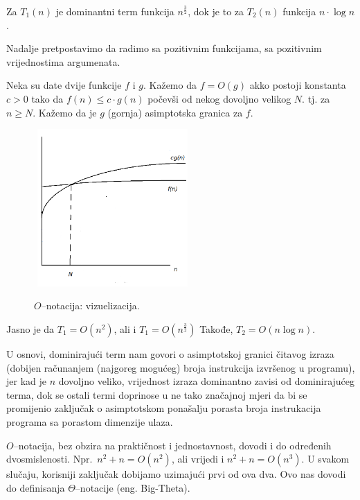 Za $T_1(n)$  je dominantni term funkcija $n^{\frac{3}{2}}$, dok je to za $T_2(n)$ funkcija $n \cdot \log n$. 
 
 Nadalje pretpostavimo da radimo sa pozitivnim funkcijama, sa pozitivnim vrijednostima argumenata. 


\begin{definition}
Neka su date dvije funkcije $f$ i $g$. Kažemo da $f = O(g)$ akko postoji konstanta $c >0$ tako da $f(n) \leq c \cdot g(n)$ počevši od nekog dovoljno velikog $N$. tj. za $n \geq {N}$. Kažemo da je $g$ (gornja) asimptotska granica za $f$. 
\end{definition}

\begin{figure}[H]
	\centering
	\includegraphics[width=170pt,height=170pt]{slike/O_notation.png}
	\label{fig:O_notation}
	\caption{$O$--notacija: vizuelizacija.}
\end{figure}



\begin{example}
	Jasno je da $T_1 = O(n^2)$, ali i $T_1 = O(n^{\frac{3}{2}})$ Takođe, $T_2 = O(n \log n)$. 
\end{example}

U osnovi, dominirajući term nam govori o asimptotskoj granici čitavog izraza (dobijen računanjem (najgoreg mogućeg) broja instrukcija izvršenog u programu), jer kad je $n$ dovoljno veliko, vrijednost izraza dominantno zavisi od dominirajućeg terma, dok se ostali termi doprinose u ne tako značajnoj mjeri da bi se promijenio zaključak o asimptotskom ponašalju porasta broja instrukacija programa sa porastom dimenzije ulaza. 

$O$--notacija, bez obzira na praktičnost i jednostavnost, dovodi i do određenih  dvosmislenosti. Npr.\  $n^2 + n = O(n^2)$, ali vrijedi i $n^2 + n = O(n^3)$. U svakom slučaju, korisniji zaključak dobijamo uzimajući prvi od ova dva.  Ovo nas dovodi do definisanja $\Theta$--notacije (eng. Big-Theta).

